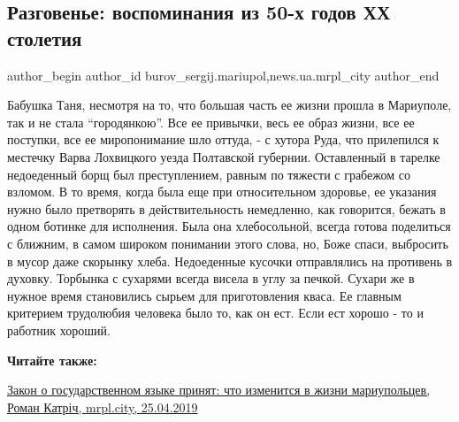  
 
 
 
 
 
\subsection{Разговенье: воспоминания из 50-х годов ХХ столетия}
\label{sec:26_04_2019.stz.news.ua.mrpl_city.1.razgovenje_vospominania_iz_50_godov_xx_stoletia}
 
\ifcmt
 author_begin
   author_id burov_sergij.mariupol,news.ua.mrpl_city
 author_end
\fi


Бабушка Таня, несмотря на то, что большая часть ее жизни прошла в Мариуполе,
так и не стала \enquote{городянкою}. Все ее привычки, весь ее образ жизни, все ее
поступки, все ее миропонимание шло оттуда, - с хутора Руда, что прилепился к
местечку Варва Лохвицкого уезда Полтавской губернии. Оставленный в тарелке
недоеденный борщ был преступлением, равным по тяжести с грабежом со взломом. В
то время, когда была еще при относительном здоровье, ее указания нужно было
претворять в действительность немедленно, как говорится, бежать в одном ботинке
для исполнения. Была она хлебосольной, всегда готова поделиться с ближним, в
самом широком понимании этого слова, но, Боже спаси, выбросить в мусор даже
скорынку хлеба. Недоеденные кусочки отправлялись на противень в духовку.
Торбынка с сухарями всегда висела в углу за печкой. Сухари же в нужное время
становились сырьем для приготовления кваса. Ее главным критерием трудолюбия
человека было то, как он ест. Если ест хорошо - то и работник хороший.

\textbf{Читайте также:} 

\href{https://mrpl.city/news/view/zakon-o-gosudarstvennom-yazyke-prinyat-chto-izmenitsya-v-zhizni-mariupoltsev}{%
Закон о государственном языке принят: что изменится в жизни мариупольцев, Роман Катріч, mrpl.city, 25.04.2019}

